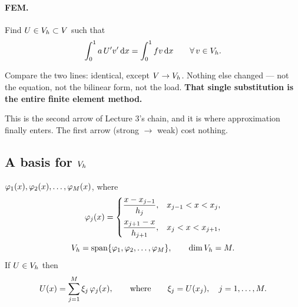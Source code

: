 \paragraph{FEM.} Find $U\in V_{h}\subset V$ such that
\begin{equation}\label{eq:fem4}
  \int_{0}^{1} a\,U'v'\,\mathrm{d} x=\int_{0}^{1} f v\,\mathrm{d} x \qquad\forall\,v\in V_{h} .
\end{equation}

\begin{intuition}
Compare the two lines: identical, except $V\to V_{h}$. Nothing else changed --- not
the equation, not the bilinear form, not the load. \textbf{That single
substitution is the entire finite element method.}

This is the second arrow of Lecture 3's chain, and it is where approximation
finally enters. The first arrow (strong $\to$ weak) cost nothing.
\end{intuition}

\subsection*{A basis for $V_{h}$}

$\varphi_{1}(x),\varphi_{2}(x),\dots,\varphi_{M}(x)$, where
\begin{equation}\label{eq:hat4}
  \varphi_{j}(x)=\begin{cases}
    \dfrac{x-x_{j-1}}{h_{j}}, & x_{j-1}<x<x_{j},\\[10pt]
    \dfrac{x_{j+1}-x}{h_{j+1}}, & x_{j}<x<x_{j+1},
  \end{cases}
\end{equation}
\begin{equation}
  V_{h}=\operatorname{span}\{\varphi_{1},\varphi_{2},\dots,\varphi_{M}\},
  \qquad \dim V_{h}=M .
\end{equation}
If $U\in V_{h}$ then
\begin{equation}\label{eq:Uexp}
  U(x)=\sum_{j=1}^{M}\xi_{j}\,\varphi_{j}(x),
  \qquad\text{where}\qquad
  \xi_{j}=U(x_{j}),\quad j=1,\dots,M .
\end{equation}


